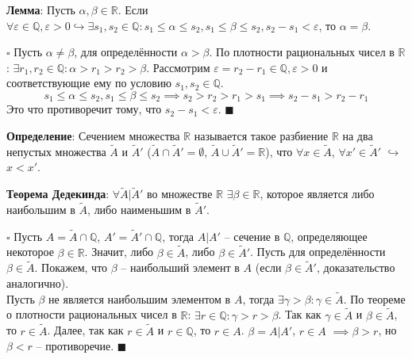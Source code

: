 \documentclass[12pt, a4paper, reqno]{article}
\begin{document}
    \textbf{Лемма}: Пусть $\alpha, \beta \in \mathbb{R}$. Если $\forall \varepsilon\in\mathbb{Q},
    \varepsilon > 0 \hookrightarrow \exists s_1, s_2 \in\mathbb{Q}: s_1 \leq \alpha \leq s_2, s_1
    \leq \beta \leq s_2, s_2 - s_1 < \varepsilon$, то $\alpha = \beta$.

    $\square$ Пусть $\alpha \neq \beta$, для определённости $\alpha > \beta$. По плотности
    рациональных чисел в $\mathbb{R}$: $\exists r_1, r_2\in\mathbb{Q}: \alpha > r_1 > r_2 > \beta$.
    Рассмотрим $\varepsilon = r_2 - r_1 \in\mathbb{Q}, \varepsilon > 0$ и соответствующие ему по
    условию $s_1, s_2 \in\mathbb{Q}$.\\
    \begin{equation*}
    s_1 \leq \alpha \leq s_2, s_1 \leq \beta \leq s_2 \implies s_2 > r_2 > r_1 > s_1 \implies
    s_2 - s_1 > r_2 - r_1
    \end{equation*}
    Это что противоречит тому, что $s_2 - s_1 < \varepsilon$. $\blacksquare$

    \textbf{Определение}: Сечением множества $\mathbb{R}$ называется такое разбиение $\mathbb{R}$ на
    два непустых множества $\tilde{A}$ и $\tilde{A}'$ ($\tilde{A} \cap \tilde{A}' = \emptyset$,
    $\tilde{A} \cup \tilde{A}' = \mathbb{R}$), что $\forall x \in \tilde{A}$, $\forall x' \in
    \tilde{A}'$ $\hookrightarrow$ $x < x'$.

    \textbf{Теорема Дедекинда}: $\forall \tilde{A}|\tilde{A}'$ во множестве $\mathbb{R}$ $\exists
    \beta\in\mathbb{R}$, которое является либо наибольшим в $\tilde{A}$, либо наименьшим в
    $\tilde{A}'$.

    $\square$ Пусть $A = \tilde{A}\cap\mathbb{Q}$, $A' = \tilde{A}'\cap\mathbb{Q}$, тогда $A|A'$ --
    сечение в $\mathbb{Q}$, определяющее некоторое $\beta\in\mathbb{R}$. Значит, либо
    $\beta\in\tilde{A}$, либо $\beta\in\tilde{A}'$. Пусть для определённости $\beta\in\tilde{A}$.
    Покажем, что $\beta$ -- наибольший элемент в $A$ (если $\beta\in\tilde{A}'$, доказательство
    аналогично). \\
    Пусть $\beta$ не является наибольшим элементом в $A$, тогда
    $\exists\gamma > \beta: \gamma\in\tilde{A}$. По теореме о плотности рациональных чисел в
    $\mathbb{R}$: $\exists r\in\mathbb{Q}: \gamma > r > \beta$. Так как $\gamma\in\tilde{A}$ и
    $\beta\in\tilde{A}$, то $r\in\tilde{A}$. Далее, так как $r\in\tilde{A}$ и $r\in\mathbb{Q}$, то
    $r\in A$. $\beta = A|A'$, $r\in A$ $\implies \beta > r$, но $\beta < r$ -- противоречие.
    $\blacksquare$
\end{document}
